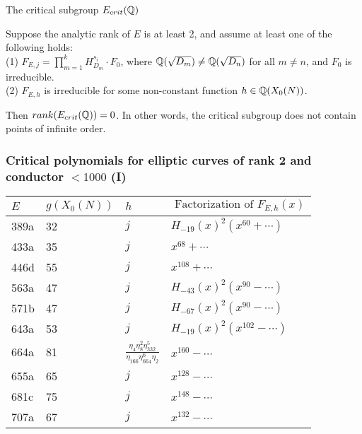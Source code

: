 \documentclass[handout]{beamer}
\begin{document}
\begin{frame}{The critical subgroup $E_{crit}(\mathbb{Q})$}
\begin{Theorem}[C.]
\label{cor: cm}
Suppose the analytic rank of $E$ is at least 2, and assume at least one of the following holds: \\ 
\vspace{4mm}
(1) $F_{E,j} = \prod_{m =1}^k H_{D_m}^{s_i}\cdot F_0$, where 
$\mathbb{Q}(\sqrt{D_m}) \neq \mathbb{Q}(\sqrt{D_n})$ for all $m\neq n$, and $F_0$ is irreducible. \\
(2) $F_{E,h}$ is irreducible for some non-constant function $h \in \mathbb{Q}(X_0(N))$. \\

\vspace{4mm}

Then $rank(E_{crit}(\mathbb{Q}))  = 0$.   In other words, the critical subgroup does not contain points of infinite order.
\end{Theorem}
\end{frame}



\begin{frame}
\frametitle{Critical polynomials for elliptic curves of rank 2 and conductor $<1000$ (I)}
\begin{center}
   \begin{table}[h!]
    \begin{tabular}{ | l | l | l | |p{4.4cm}  |}
    \hline
    $E$ & $g(X_0(N))$    & $h$ & $\mbox{ Factorization of } F_{E,h}(x)$     \\ \hline \hline
    389a & 32  & $j$ & $H_{-19}(x)^2 (x^{60}+ \cdots)$ \\ \hline
    433a & 35  & $j$ &  $x^{68}+\cdots$  \\ \hline
     446d & 55  & $j$ &  $x^{108}+\cdots$ \\ \hline
    563a & 47  & $j$ &  $H_{-43}(x)^2 (x^{90} - \cdots)$   \\ \hline
    571b& 47  & $j$ &  $H_{-67}(x)^2 (x^{90} - \cdots)$ \\ \hline
    643a& 53  & $j$ &  $H_{-19}(x)^2 (x^{102} - \cdots)$ \\ \hline
    664a & 81    &   $\frac{\eta_4\eta_8^2 \eta_{332}^5}{\eta_{166}\eta_{664}^{6}{\eta_2}}$ & $x^{160} - \cdots$ \\ \hline
    655a& 65  & $j$ &  $x^{128} - \cdots$ \\  \hline
    681c& 75  & $j$ &  $x^{148} - \cdots$ \\  \hline
    707a & 67  & $j$ & $x^{132} - \cdots$ 
        \end{tabular}
    \label{table: rank two}	
   \end{table}
\end{center}


\end{frame}
 
\end{document}
